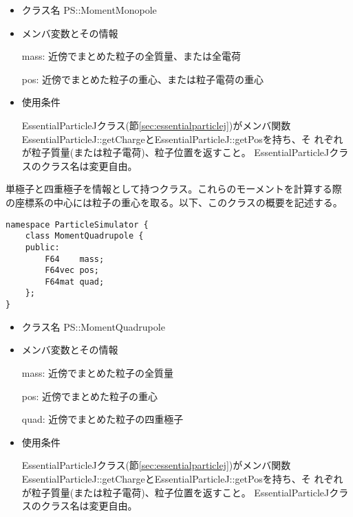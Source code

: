 \begin{itemize}
\item クラス名
  PS::MomentMonopole

\item メンバ変数とその情報

  mass: 近傍でまとめた粒子の全質量、または全電荷

  pos: 近傍でまとめた粒子の重心、または粒子電荷の重心

\item 使用条件

  EssentialParticleJクラス(節\ref{sec:essentialparticlej})がメンバ関数
  EssentialParticleJ::getChargeとEssentialParticleJ::getPosを持ち、そ
  れぞれが粒子質量(または粒子電荷)、粒子位置を返すこと。
  EssentialParticleJクラスのクラス名は変更自由。

\end{itemize}

\label{sec:MomentQuadrupole}

単極子と四重極子を情報として持つクラス。これらのモーメントを計算する際
の座標系の中心には粒子の重心を取る。以下、このクラスの概要を記述する。
\begin{screen}
\begin{verbatim}
namespace ParticleSimulator {
    class MomentQuadrupole {
    public:
        F64    mass;    
        F64vec pos;
        F64mat quad;
    };
}
\end{verbatim}
\end{screen}

\begin{itemize}
\item クラス名
  PS::MomentQuadrupole

\item メンバ変数とその情報

  mass: 近傍でまとめた粒子の全質量

  pos: 近傍でまとめた粒子の重心

  quad: 近傍でまとめた粒子の四重極子

\item 使用条件

  EssentialParticleJクラス(節\ref{sec:essentialparticlej})がメンバ関数
  EssentialParticleJ::getChargeとEssentialParticleJ::getPosを持ち、そ
  れぞれが粒子質量(または粒子電荷)、粒子位置を返すこと。
  EssentialParticleJクラスのクラス名は変更自由。

\end{itemize}

\label{sec:MomentMonopoleGeometricCenter}

